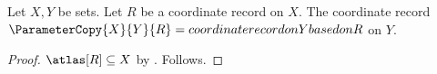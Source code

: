 

\begin{construction}\label{unproved_parameter_copy}
    Let $X,Y$ be sets.
    Let $R$ be a coordinate record on $X$.
    The coordinate record $\ParameterCopy{X}{Y}{R}=
        coordinate record on Y based on R$ on $Y$.
\end{construction}
\begin{proof}
    $\atlas[R]\subseteq X$ by .
    Follows.
\end{proof}
